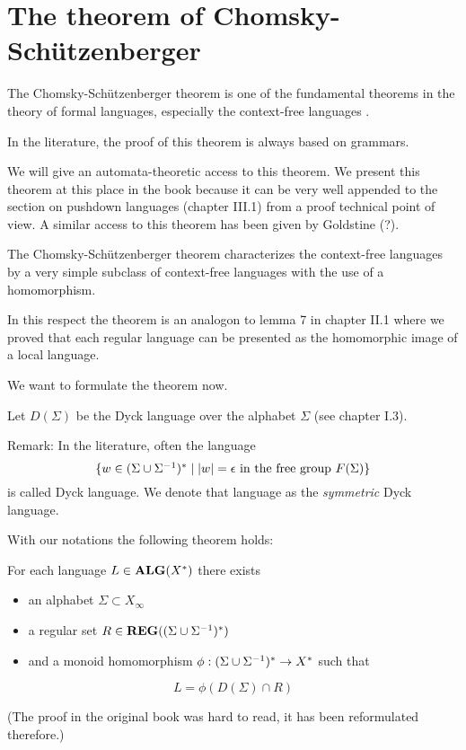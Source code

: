 \section{The theorem of Chomsky-Schützenberger}

The Chomsky-Schützenberger theorem is one of the fundamental theorems in the
theory of formal languages, especially the context-free languages \cite{ChSch}.

In the literature, the proof of this theorem is always based on grammars.

We will give an automata-theoretic access to this theorem. We present this
theorem at this place in the book because it can be very well appended to the
section on pushdown languages (chapter III.1) from a proof technical point of
view. A similar access to this theorem has been given by Goldstine
\cite{Goldstine77} (?).

The Chomsky-Schützenberger theorem characterizes the context-free languages
by a very simple subclass of context-free languages with the use of a
homomorphism.

In this respect the theorem is an analogon to lemma 7 in chapter II.1 where we
proved that each regular language can be presented as the homomorphic image of
a local language.

We want to formulate the theorem now.

Let $D(\Sigma)$ be the Dyck language over the alphabet $\Sigma$ (see chapter
I.3).

Remark: In the literature, often the language \[ \mbox{$\{w\in
(\Sigma \cup {\Sigma}^{-1})^* \mid |w|= \epsilon\text{ in the free group }F(\Sigma)\}$} \]
is called Dyck language. We denote that language as the {\em symmetric} Dyck
language.

With our notations the following theorem holds:
\begin{theorem} For each language $L\in \mbox{{\bf ALG}}(X^*)$
there exists
\begin{itemize}
  \item an alphabet $\Sigma \subset X_\infty$
  \item a regular set $R\in \mbox{{\bf REG}}((\Sigma \cup {\Sigma}^{-1})^*)$
  \item and a monoid homomorphism $\phi: (\Sigma \cup {\Sigma}^{-1})^* \to X^*$ such
  that
\end{itemize}
\[ L = \phi(D(\Sigma)\cap R) \]
\end{theorem}

(The proof in the original book was hard to read, it has been reformulated
therefore.)

